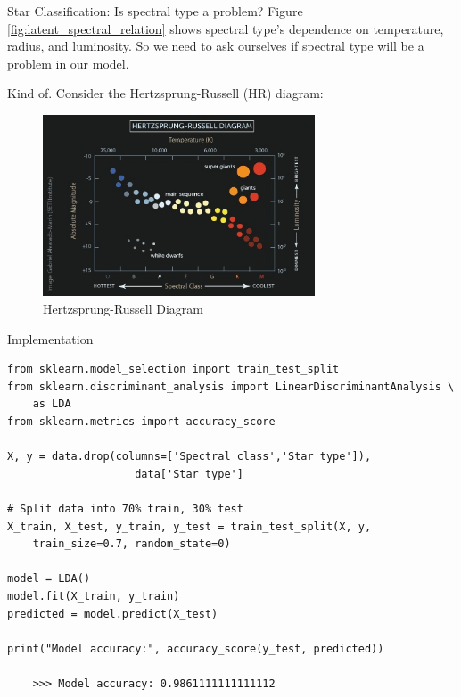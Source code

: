 \documentclass[9pt]{beamer}
\begin{document}
\begin{frame}{Star Classification: Is spectral type a problem?}
    Figure \ref{fig:latent_spectral_relation} shows spectral type's dependence on temperature, radius, and luminosity.
    So we need to ask ourselves if spectral type will be a problem in our model.
    
    Kind of. Consider the Hertzsprung-Russell (HR) diagram:
    \begin{figure}
        \centering
        \includegraphics[width=0.72\textwidth]{hr.jpg}
        \caption{Hertzsprung-Russell Diagram}
        \label{fig:hr_diagram}
    \end{figure}
\end{frame}

\begin{frame}[fragile]{Implementation}
\begin{verbatim}
from sklearn.model_selection import train_test_split
from sklearn.discriminant_analysis import LinearDiscriminantAnalysis \
    as LDA
from sklearn.metrics import accuracy_score

X, y = data.drop(columns=['Spectral class','Star type']), 
                    data['Star type']

# Split data into 70% train, 30% test
X_train, X_test, y_train, y_test = train_test_split(X, y, 
    train_size=0.7, random_state=0)

model = LDA()
model.fit(X_train, y_train)
predicted = model.predict(X_test)

print("Model accuracy:", accuracy_score(y_test, predicted))

    >>> Model accuracy: 0.9861111111111112
\end{verbatim}
\end{frame}
\end{document}
